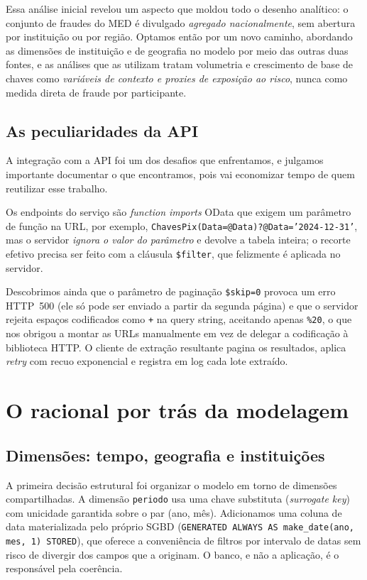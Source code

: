 \documentclass[12pt,a4paper]{article}
\newcommand{\code}[1]{\texttt{#1}}
\begin{document}
Essa análise inicial revelou um aspecto que moldou todo o desenho analítico: o
conjunto de fraudes do MED é divulgado \emph{agregado nacionalmente}, sem
abertura por instituição ou por região. Optamos então por um novo caminho, abordando as dimensões de instituição e de geografia no modelo por meio das outras duas fontes,
e as análises que as utilizam tratam volumetria e crescimento de base de
chaves como \emph{variáveis de contexto e proxies de exposição ao risco},
nunca como medida direta de fraude por participante.

\subsection{As peculiaridades da API}

A integração com a API foi um dos desafios que enfrentamos, e julgamos
importante documentar o que encontramos, pois vai economizar tempo de quem
reutilizar esse trabalho. 

Os endpoints do serviço são \emph{function imports} OData que exigem um parâmetro de função na URL, por exemplo, \code{ChavesPix(Data=@Data)?@Data='2024-12-31'}, mas o servidor \emph{ignora o valor do parâmetro} e devolve a tabela inteira; o recorte efetivo precisa ser feito com a cláusula \code{\$filter}, que felizmente é aplicada no servidor. 

Descobrimos ainda que o parâmetro de paginação \code{\$skip=0} provoca um erro HTTP~500 (ele só pode ser enviado a partir da segunda página) e que o servidor rejeita espaços codificados como
\code{+} na query string, aceitando apenas \code{\%20}, o que nos obrigou a montar as URLs manualmente em vez de delegar a codificação à biblioteca HTTP. O cliente de extração resultante pagina os resultados, aplica \emph{retry} com recuo exponencial e registra em log cada lote extraído.

\section{O racional por trás da modelagem}

\subsection{Dimensões: tempo, geografia e instituições}

A primeira decisão estrutural foi organizar o modelo em torno de dimensões
compartilhadas. A dimensão \code{periodo} usa uma chave substituta
(\emph{surrogate key}) com unicidade garantida sobre o par (ano, mês). Adicionamos uma coluna de data materializada pelo próprio SGBD (\code{GENERATED ALWAYS AS make\_date(ano, mes, 1) STORED}), que oferece a conveniência de filtros por intervalo de datas sem risco de divergir dos campos que a originam. O banco, e não a aplicação, é o responsável pela coerência.
\end{document}
